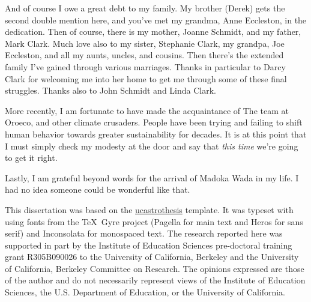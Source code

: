 \documentclass[12pt]{myucthesis}
\begin{document}
\begin{frontmatter}
\begin{acknowledgements}
And of course I owe a great debt to my family. My brother (Derek) gets the
second double mention here, and you've met my grandma, Anne Eccleston, in the
dedication. Then of course, there is my mother, Joanne Schmidt, and my father,
Mark Clark. Much love also to my sister, Stephanie Clark, my grandpa, Joe
Eccleston, and all my aunts, uncles, and cousins. Then there's the extended
family I've gained through various marriages. Thanks in particular to Darcy
Clark for welcoming me into her home to get me through some of these final
struggles. Thanks also to John Schmidt and Linda Clark.

More recently, I am fortunate to have made the acquaintance of The team at
Oroeco, and other climate crusaders. People have been trying and failing to
shift human behavior towards greater sustainability for decades. It is at this
point that I must simply check my modesty at the door and say that \emph{this
    time} we're going to get it right.

Lastly, I am grateful beyond words for the arrival of Madoka Wada in my life. I
had no idea someone could be wonderful like that.

This dissertation was based on the
\href{https://github.com/pkgw/ucastrothesis}{\textsf{ucastrothesis}} template.
It was typeset with  using fonts from the \TeX\ Gyre project
(Pagella for main text and Heros for sans serif) and Inconsolata for monospaced
text. The research reported here was supported in part by the Institute of
Education Sciences pre-doctoral training grant R305B090026 to the University of
California, Berkeley and the University of California, Berkeley Committee on
Research. The opinions expressed are those of the author and do not necessarily
represent views of the Institute of Education Sciences, the U.S.  Department of
Education, or the University of California.


\end{acknowledgements}
\end{frontmatter}

\tabulinesep 5pt







\end{document}
